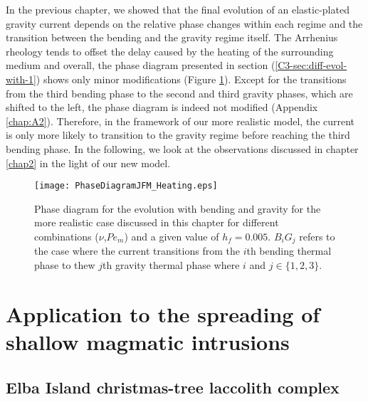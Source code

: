 In the  previous chapter,  we showed  that the  final evolution  of an
elastic-plated gravity  current depends on the  relative phase changes
within  each regime  and the  transition between  the bending  and the
gravity regime  itself.  The  Arrhenius rheology  tends to  offset the
delay caused by the heating of the surrounding medium and overall, the
phase  diagram  presented in  section  (\ref{C3-sec:diff-evol-with-1})
shows         only         minor         modifications         (Figure
\ref{C4-Phase_Diagram_Heating}).  Except for  the transitions from the
third bending phase to the second  and third gravity phases, which are
shifted  to  the  left,  the  phase diagram  is  indeed  not  modified
(Appendix  \ref{chap:A2}). Therefore,  in  the framework  of our  more
realistic model, the current is only  more likely to transition to the
gravity  regime  before reaching  the  third  bending phase.   In  the
following,  we   look  at   the  observations  discussed   in  chapter
\ref{chap2} in the light of our new model.

\begin{figure}[h!]
  \begin{center}
    \graphicspath{ {/Users/thorey/Documents/These/Projet/Refroidissement/Skin_Model/Figure/Figure_Heating/} }
    \texttt{[image: PhaseDiagramJFM\_Heating.eps]}
    \caption{Phase diagram for the  evolution with bending and gravity
      for  the  more realistic  case  discussed  in this  chapter  for
      different  combinations  ($\nu$,$Pe_m$)  and a  given  value  of
      $h_f =  0.005$.  $B_iG_j$ refers  to the case where  the current
      transitions from the  $i$th bending thermal phase  to thew $j$th
      gravity thermal phase where $i$ and $j \in \{1,2,3\}$.}
    \label{C4-Phase_Diagram_Heating}
  \end{center}
\end{figure}

\section{Application to the spreading of shallow magmatic intrusions}
\label{C4-sec:appl-spre-shall}

\subsection{Elba Island christmas-tree laccolith complex}
\label{C4-sec:appl-arrest-terr}


